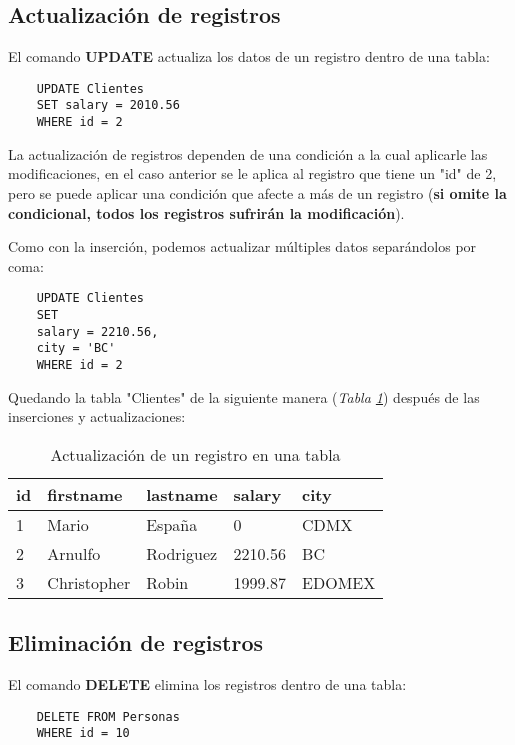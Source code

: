 \subsection{Actualización de registros}

El comando \textbf{UPDATE} actualiza los datos de un registro dentro de una tabla:
\begin{lstlisting}
    UPDATE Clientes
    SET salary = 2010.56
    WHERE id = 2
\end{lstlisting}

La actualización de registros dependen de una condición a la cual aplicarle las modificaciones, en el caso anterior se le aplica al registro que tiene un "id" de 2, pero se puede aplicar una condición que afecte a más de un registro (\textbf{si omite la condicional, todos los registros sufrirán la modificación}).

Como con la inserción, podemos actualizar múltiples datos separándolos por coma:
\begin{lstlisting}
    UPDATE Clientes
    SET
    salary = 2210.56,
    city = 'BC'
    WHERE id = 2
\end{lstlisting}

Quedando la tabla "Clientes" de la siguiente manera (\textit{Tabla \ref{tab: 24}}) después de las inserciones y actualizaciones:
\begin{table}[H]
    \centering
    \caption{Actualización de un registro en una tabla}
    \label{tab: 24}
    \begin{tabular}{|l|l|l|l|l|}
        \hline
        \textbf{id} & \textbf{firstname} & \textbf{lastname} & \textbf{salary} & \textbf{city} \\
        \hline
        1 & Mario       & España    & 0         & CDMX \\ 
        \hline
        2 & Arnulfo     & Rodriguez & 2210.56    & BC \\
        \hline
        3 & Christopher & Robin     & 1999.87   & EDOMEX \\
        \hline
    \end{tabular}
\end{table}


\subsection{Eliminación de registros}

El comando \textbf{DELETE} elimina los registros dentro de una tabla:
\begin{lstlisting}
    DELETE FROM Personas
    WHERE id = 10
\end{lstlisting}

